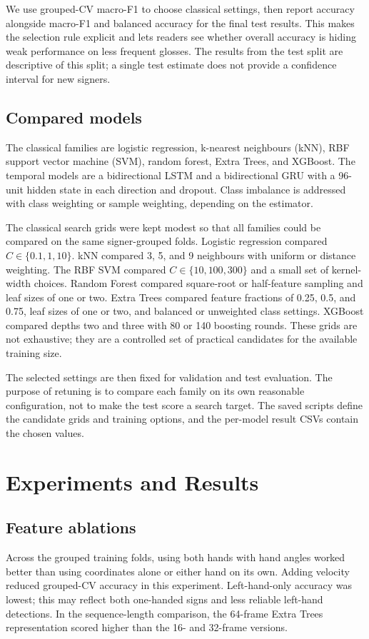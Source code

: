\documentclass[12pt,a4paper,oneside]{report}
\begin{document}
We use grouped-CV macro-F1 to choose classical settings, then report accuracy alongside macro-F1 and balanced accuracy for the final test results. This makes the selection rule explicit and lets readers see whether overall accuracy is hiding weak performance on less frequent glosses. The results from the test split are descriptive of this split; a single test estimate does not provide a confidence interval for new signers.

\section{Compared models}
The classical families are logistic regression, k-nearest neighbours (kNN), RBF support vector machine (SVM), random forest, Extra Trees, and XGBoost. The temporal models are a bidirectional LSTM and a bidirectional GRU with a 96-unit hidden state in each direction and dropout. Class imbalance is addressed with class weighting or sample weighting, depending on the estimator.

The classical search grids were kept modest so that all families could be compared on the same signer-grouped folds. Logistic regression compared $C\in\{0.1,1,10\}$. kNN compared 3, 5, and 9 neighbours with uniform or distance weighting. The RBF SVM compared $C\in\{10,100,300\}$ and a small set of kernel-width choices. Random Forest compared square-root or half-feature sampling and leaf sizes of one or two. Extra Trees compared feature fractions of 0.25, 0.5, and 0.75, leaf sizes of one or two, and balanced or unweighted class settings. XGBoost compared depths two and three with 80 or 140 boosting rounds. These grids are not exhaustive; they are a controlled set of practical candidates for the available training size.

The selected settings are then fixed for validation and test evaluation. The purpose of retuning is to compare each family on its own reasonable configuration, not to make the test score a search target. The saved scripts define the candidate grids and training options, and the per-model result CSVs contain the chosen values.

\chapter{Experiments and Results}
\section{Feature ablations}
Across the grouped training folds, using both hands with hand angles worked better than using coordinates alone or either hand on its own. Adding velocity reduced grouped-CV accuracy in this experiment. Left-hand-only accuracy was lowest; this may reflect both one-handed signs and less reliable left-hand detections. In the sequence-length comparison, the 64-frame Extra Trees representation scored higher than the 16- and 32-frame versions.
\end{document}
